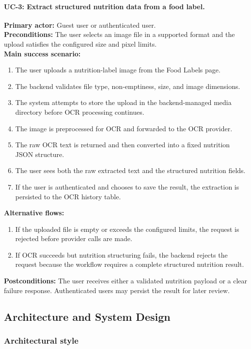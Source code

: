\paragraph{UC-3: Extract structured nutrition data from a food label.}
\textbf{Primary actor:} Guest user or authenticated user. \\
\textbf{Preconditions:} The user selects an image file in a supported
format and the upload satisfies the configured size and pixel limits. \\
\textbf{Main success scenario:}
\begin{enumerate}
	\item The user uploads a nutrition-label image from the Food Labels
	page.
	\item The backend validates file type, non-emptiness, size, and image
	dimensions.
	\item The system attempts to store the upload in the
	backend-managed media directory before OCR processing continues.
	\item The image is preprocessed for OCR and forwarded to the OCR
	provider.
	\item The raw OCR text is returned and then converted into a fixed
	nutrition JSON structure.
	\item The user sees both the raw extracted text and the structured
	nutrition fields.
	\item If the user is authenticated and chooses to save the result, the
	extraction is persisted to the OCR history table.
\end{enumerate}
\textbf{Alternative flows:}
\begin{enumerate}
	\item If the uploaded file is empty or exceeds the configured limits,
	the request is rejected before provider calls are made.
	\item If OCR succeeds but nutrition structuring fails, the backend
	rejects the request because the workflow requires a complete
	structured nutrition result.
\end{enumerate}
\textbf{Postconditions:} The user receives either a validated nutrition
payload or a clear failure response. Authenticated users may persist the
result for later review.

\subsection{Architecture and System Design}

\subsubsection{Architectural style}

